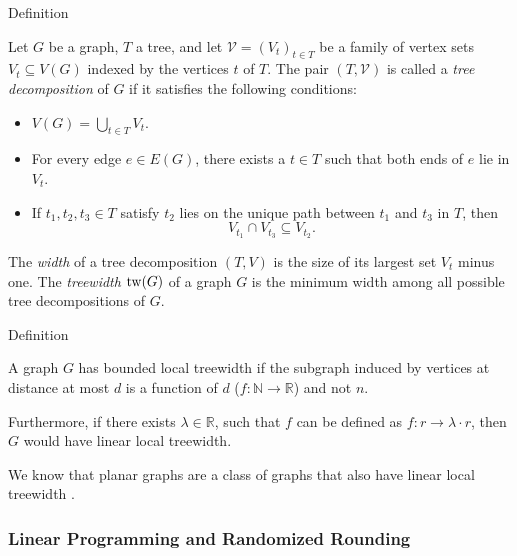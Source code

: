 \begin{mydefinition}{Definition}
    \label{def:tree-decomp}

    Let $G$ be a graph, $T$ a tree, and let $\mathcal{V} = (V_t)_{t \in T}$ be a family of vertex sets
    $V_t \subseteq V(G)$ indexed by the vertices $t$ of $T$.
    The pair $(T, \mathcal{V})$ is called a \emph{tree decomposition} of $G$ if it satisfies
    the following conditions:

    \begin{itemize}
        \item[(T1)] $V(G) = \bigcup_{t \in T} V_t$.
        \item[(T2)] For every edge $e \in E(G)$, there exists a $t \in T$ such that both ends of $e$ lie in $V_t$.
        \item[(T3)] If $t_1, t_2, t_3 \in T$ satisfy $t_2$ lies on the unique path between $t_1$ and $t_3$ in $T$, then 
        \[
            V_{t_1} \cap V_{t_3} \subseteq V_{t_2}.
        \]
    \end{itemize}

\end{mydefinition}

The \textit{width} of a tree decomposition $(T, V)$ is the size of its largest set $V_t$ minus one.
The \textit{treewidth} $\operatorname{tw}(G)$ of a graph $G$ is the minimum width among all possible
tree decompositions of $G$. 

\begin{mydefinition}{Definition}
    \label{def:bounded-local-treewidth}

    A graph $G$ has bounded local treewidth if the subgraph induced by vertices at distance 
    at most $d$ is a function of $d$ ($f : \mathbb{N} \to \mathbb{R}$) and not $n$.

\end{mydefinition}

Furthermore, if there exists $\lambda \in \mathbb{R}$, such that 
$f$ can be defined as $f : r \to \lambda \cdot r$, then $G$ would have linear local treewidth.

We know that planar graphs are a class of graphs that also have linear 
local treewidth \cite{bodlaender1998partial,eppstein2000diameter,demaine2003equivalence}.

\subsubsection{Linear Programming and Randomized Rounding}

